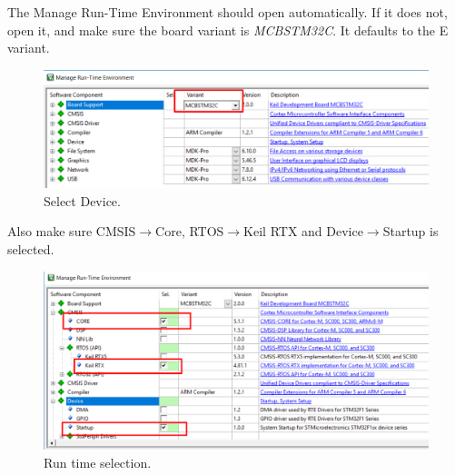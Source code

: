 \documentclass{article}
\begin{document}
\newpage

The Manage Run-Time Environment should open automatically. If it
does not, open it, and make sure the board variant is \textit{MCBSTM32C}.
It defaults to the E variant.
\begin{figure}[H]
    \centering
    \includegraphics[width=0.8\linewidth]{pics/MRTSetVariant.png}
    \caption{Select Device.}
    \label{fig:SelectDevice}
\end{figure}

Also make sure CMSIS$\to$Core, RTOS$\to$Keil RTX and Device$\to$Startup is selected.
\begin{figure}[H]
    \centering
    \includegraphics[width=0.8\linewidth]{pics/BasicRuntimeSelection.png}
    \caption{Run time selection.}
    \label{fig:BasicRuntimeSelection}
\end{figure}
\end{document}
